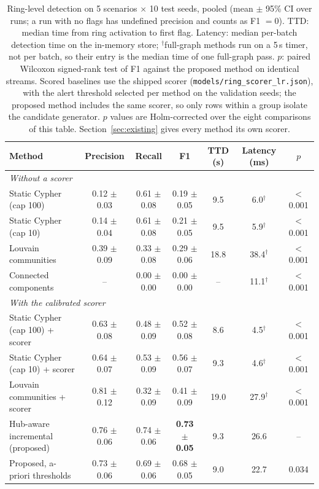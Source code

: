 \begin{table}[t]
\centering
\caption{Ring-level detection on 5 scenarios $\times$ 10 test seeds, pooled (mean $\pm$ 95\% CI over runs;
a run with no flags has undefined precision and counts as F1 $=0$). TTD: median time from ring activation to
first flag. Latency: median per-batch detection time on the in-memory store; $^\dagger$full-graph
methods run on a 5\,s timer, not per batch, so their entry is the median time of one full-graph pass. $p$: paired Wilcoxon signed-rank
test of F1 against the proposed method on identical streams. Scored baselines use the shipped scorer (\texttt{models/ring\_scorer\_lr.json}), with the alert threshold selected per method on the validation seeds; the proposed method includes the same scorer, so only rows within a group isolate the candidate generator. $p$ values are Holm-corrected over the eight comparisons of this table. Section~\ref{sec:existing} gives every method its own scorer.}
\label{tab:baselines}
\begin{tabular}{lcccccc}
\toprule
Method & Precision & Recall & F1 & TTD (s) & Latency (ms) & $p$ \\
\midrule
\multicolumn{7}{l}{\textit{Without a scorer}} \\
Static Cypher (cap 100) & 0.12 $\pm$ 0.03 & 0.61 $\pm$ 0.08 & 0.19 $\pm$ 0.05 & 9.5 & 6.0$^\dagger$ & $<$0.001 \\
Static Cypher (cap 10) & 0.14 $\pm$ 0.04 & 0.61 $\pm$ 0.08 & 0.21 $\pm$ 0.05 & 9.5 & 5.9$^\dagger$ & $<$0.001 \\
Louvain communities & 0.39 $\pm$ 0.09 & 0.33 $\pm$ 0.08 & 0.29 $\pm$ 0.06 & 18.8 & 38.4$^\dagger$ & $<$0.001 \\
Connected components & -- & 0.00 $\pm$ 0.00 & 0.00 $\pm$ 0.00 & -- & 11.1$^\dagger$ & $<$0.001 \\
\midrule
\multicolumn{7}{l}{\textit{With the calibrated scorer}} \\
Static Cypher (cap 100) + scorer & 0.63 $\pm$ 0.08 & 0.48 $\pm$ 0.09 & 0.52 $\pm$ 0.08 & 8.6 & 4.5$^\dagger$ & $<$0.001 \\
Static Cypher (cap 10) + scorer & 0.64 $\pm$ 0.07 & 0.53 $\pm$ 0.09 & 0.56 $\pm$ 0.07 & 9.3 & 4.6$^\dagger$ & $<$0.001 \\
Louvain communities + scorer & 0.81 $\pm$ 0.12 & 0.32 $\pm$ 0.09 & 0.41 $\pm$ 0.09 & 19.0 & 27.9$^\dagger$ & $<$0.001 \\
Hub-aware incremental (proposed) & 0.76 $\pm$ 0.06 & 0.74 $\pm$ 0.06 & \textbf{0.73 $\pm$ 0.05} & 9.3 & 26.6 & -- \\
Proposed, a-priori thresholds & 0.73 $\pm$ 0.06 & 0.69 $\pm$ 0.06 & 0.68 $\pm$ 0.05 & 9.0 & 22.7 & 0.034 \\
\bottomrule
\end{tabular}
\end{table}
